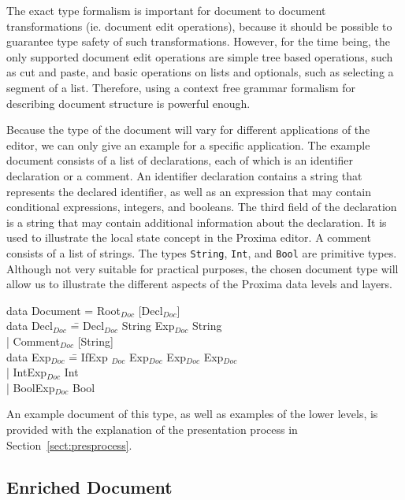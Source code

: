 The exact type formalism is important for document to document transformations (ie. document edit operations), because it should be possible to guarantee type safety of such transformations. However, for the time being, the only supported document edit operations are simple tree based operations, such as cut and paste, and basic operations on lists and optionals, such as selecting a segment of a list. Therefore, using a context free grammar formalism for describing document structure is powerful enough.
 
Because the type of the document will vary for different applications of the editor, we can only give an example for a specific application. The example document consists of a list of declarations, each of which is an identifier declaration or a comment. An identifier declaration contains a string that represents the declared identifier, as well as an expression that may contain conditional expressions, integers, and booleans. The third field of the declaration is a string that may contain additional information about the declaration. It is used to illustrate the local state concept in the Proxima editor. A comment consists of a list of strings. The types {\tt String}, {\tt Int}, and {\tt Bool} are primitive types. Although not very suitable for practical purposes, the chosen document type will allow us to illustrate the different aspects of the Proxima data levels and layers.

\noindent
\ttfamily
\begin{tabbing}
data Document = Root$_{Doc}$ [Decl$_{Doc}$]\\
data Decl$_{Doc}$ \= = Decl$_{Doc}$ String Exp$_{Doc}$ String\\
                            \> | Comment$_{Doc}$ [String]\\
data Exp$_{Doc}$ \= =  IfExp $_{Doc}$ Exp$_{Doc}$ Exp$_{Doc}$ Exp$_{Doc}$\\
                 \> | IntExp$_{Doc}$ Int\\
                 \> | BoolExp$_{Doc}$ Bool\\
\end{tabbing}
\rmfamily

An example document of this type, as well as examples of the lower levels, is provided with the explanation of the presentation process in Section~\ref{sect:presprocess}.

\subsection{Enriched Document} \label{sect:enrLevel}

